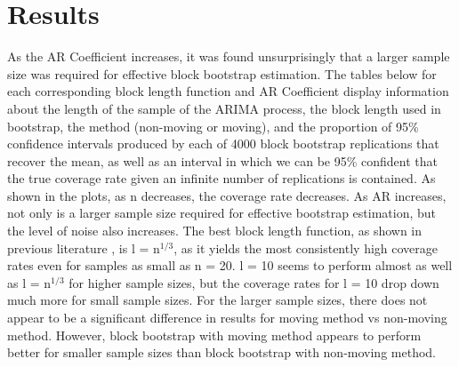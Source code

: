 \documentclass[12pt, letterpaper, titlepage]{article}
\begin{document}
 

\section{Results}
\label{sec:results}

As the AR Coefficient increases, it was found unsurprisingly that a larger sample size was 
required for effective block bootstrap estimation. The tables below for each corresponding block length function and AR Coefficient display information about the length of the sample of the ARIMA process, the block length used in bootstrap, the method (non-moving or moving), and the proportion of 95\% confidence intervals produced by each of 4000 block bootstrap replications that recover the mean, as well as an interval in which we can be 95\% confident that the true coverage rate given an infinite number of replications is contained. 
As shown in the plots, as n decreases, the coverage rate decreases. As AR increases, not only is a larger sample size required for effective bootstrap estimation, but the level of noise also increases. The best block length function, as shown in previous literature \citep{buhlmann1999block}, is l = n$^{1/3}$, as it yields the most consistently high coverage rates even for samples as small as n = 20. l = 10 seems to perform almost as well as l = n$^{1/3}$ for higher sample sizes, but the coverage rates for l = 10 drop down much more for small sample sizes. For the larger sample sizes, there does not appear to be a significant difference in results for moving method vs non-moving method. However, block bootstrap with moving method appears to perform better for smaller sample sizes than block bootstrap with non-moving method.
\end{document}
